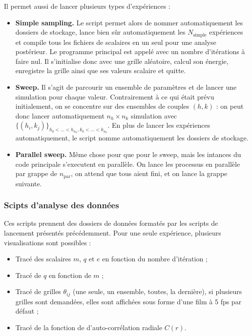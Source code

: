 \documentclass[a4paper, 11pt]{article}
\begin{document}
Il permet aussi de lancer plusieurs types d'expériences :
\begin{itemize}
    \item \textbf{Simple sampling.} Le script permet alors de nommer automatiquement les dossiers de
        stockage, lance bien sûr automatiquement les $N_\text{simple}$ expériences et compile tous
        les fichiers de scalaires en un seul pour une analyse postérieur. Le programme principal est
        appelé avec un nombre d'itérations à faire nul. Il s'initialise donc avec une grille
        aléatoire, calcul son énergie, enregistre la grille ainsi que ses valeurs scalaire et
        quitte.
    \item \textbf{Sweep.} Il s'agit de parcourir un ensemble de paramètres et de lancer une
        simulation pour chaque valeur. Contrairement à ce qui était prévu initialement, on se
        concentre sur des ensembles de couples $(h, k)$ : on peut donc lancer automatiquement 
        $n_h\times n_k$ simulation avec $\{(h_i, k_j)\}_{h_0 < \hdots < h_{n_h}, k_0 < \hdots < k_{n_k}}$.
        En plus de lancer les expériences automatiquement, le script nomme automatiquement les
        dossiers de stockage. 
    \item \textbf{Parallel sweep.} Même chose pour que pour le sweep, mais les intances du code
        principale s'executent en parallèle. On lance les processus en parallèle par grappe de
        $n_\text{par}$, on attend que tous aient fini, et on lance la grappe suivante.
\end{itemize}


\subsubsection{Scipts d'analyse des données}

Ces scripts prennent des dossiers de données formatés par les scripts de lancement présentés
précédemment. Pour une seule expérience, plusieurs visualisations sont possibles :
\begin{itemize}
    \item Tracé des scalaires $m$, $q$ et $e$ en fonction du nombre d'itération ;
    \item Tracé de $q$ en fonction de $m$ ;
    \item Tracé de grilles $\theta_{ij}$ (une seule, un ensemble, toutes, la dernière), si
        plusieurs grilles sont demandées, elles sont affichées sous forme d'une film à 5 fps par
        défaut ;
    \item Tracé de la fonction de d'auto-corrélation radiale $C(r)$.
\end{itemize}
\end{document}
